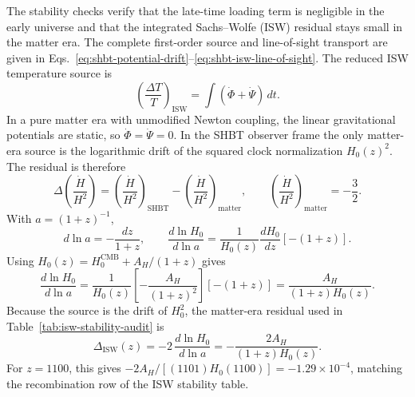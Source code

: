 \documentclass[11pt,letterpaper]{article}
\theoremstyle{plain}
\newcommand{\hcmb}{H_0^{\text{CMB}}}
\newcommand{\AH}{A_H}
\begin{document}
The stability checks verify that the late-time loading term is negligible in
the early universe and that the integrated Sachs--Wolfe (ISW) residual stays
small in the matter era.  The complete first-order source and line-of-sight
transport are given in
Eqs.~\eqref{eq:shbt-potential-drift}--\eqref{eq:shbt-isw-line-of-sight}.
The reduced ISW temperature source is
\begin{equation}
\label{eq:isw-temperature-source-section-nine}
 \left(\frac{\Delta T}{T}\right)_{\text{ISW}}
 =
 \int\left(\dot\Phi+\dot\Psi\right)\,dt.
\end{equation}
In a pure matter era with unmodified Newton coupling, the linear gravitational
potentials are static, so \(\dot\Phi=\dot\Psi=0\).  In the SHBT observer frame
the only matter-era source is the logarithmic drift of the
squared clock normalization \(H_0(z)^2\).  The residual is therefore
\begin{equation}
\label{eq:isw-residual-definition}
 \Delta\!\left(\frac{\dot H}{H^2}\right)
 =
 \left(\frac{\dot H}{H^2}\right)_{\text{SHBT}}
 -
 \left(\frac{\dot H}{H^2}\right)_{\text{matter}},
 \qquad
 \left(\frac{\dot H}{H^2}\right)_{\text{matter}}=-\frac32.
\end{equation}
With \(a=(1+z)^{-1}\),
\begin{equation}
\label{eq:isw-log-scale-conversion}
 d\ln a
 =
 -\frac{dz}{1+z},
 \qquad
 \frac{d\ln H_0}{d\ln a}
 =
 \frac{1}{H_0(z)}
 \frac{dH_0}{dz}
 \left[-(1+z)\right].
\end{equation}
Using \(H_0(z)=\hcmb+\AH/(1+z)\) gives
\begin{equation}
\label{eq:isw-hubble-log-drift}
 \frac{d\ln H_0}{d\ln a}
 =
 \frac{1}{H_0(z)}
 \left[-\frac{\AH}{(1+z)^2}\right]
 \left[-(1+z)\right]
 =
 \frac{\AH}{(1+z)H_0(z)}.
\end{equation}
Because the source is the drift of \(H_0^2\), the matter-era residual used in
Table~\ref{tab:isw-stability-audit} is
\begin{equation}
\label{eq:isw-loading-residual}
 \boxed{
 \Delta_{\text{ISW}}(z)
 =
 -2\,\frac{d\ln H_0}{d\ln a}
 =
 -\frac{2\AH}{(1+z)H_0(z)}.
 }
\end{equation}
For \(z=1100\), this gives
\(-2\AH/[(1101)H_0(1100)]=-1.29\times10^{-4}\), matching the recombination row
of the ISW stability table.
\end{document}
